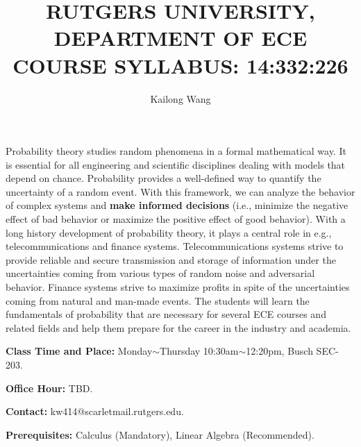\documentclass{article}
\title{RUTGERS UNIVERSITY, DEPARTMENT OF ECE \\
COURSE SYLLABUS: 14:332:226}
\author{Kailong Wang}
\date{}
\begin{document}
\maketitle
Probability theory studies random phenomena in a formal mathematical way. It is essential for all engineering and scientific disciplines dealing with models that depend on chance.
Probability provides a well-defined way to quantify the uncertainty of a random event. With this framework, we can analyze the behavior of complex systems and \textbf{make informed decisions} (i.e., minimize the negative effect of bad behavior or maximize the positive effect of good behavior).
With a long history development of probability theory, it plays a central role in e.g.,  telecommunications and finance systems. Telecommunications systems strive to provide reliable and secure transmission and storage of information under the uncertainties coming from various types of random noise and adversarial behavior. Finance systems strive to maximize profits in spite of the uncertainties coming from natural and man-made events.
The students will learn the fundamentals of probability that are necessary for several ECE courses and related fields and help them prepare for the career in the industry and academia.

\textbf{Class Time and Place:} Monday$\sim$Thursday 10:30am$\sim$12:20pm, Busch SEC-203.

\textbf{Office Hour:} TBD.

\textbf{Contact:} kw414@scarletmail.rutgers.edu.

\textbf{Prerequisites:} Calculus (Mandatory), Linear Algebra (Recommended).
\end{document}
